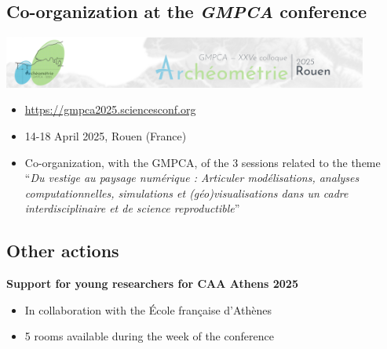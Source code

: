 \documentclass[xcolor=dvipsnames, 10pt, french, american]{beamer}
\begin{document}
\subsection{Co-organization at the \emph{GMPCA} conference}
\frame{\tableofcontents[sectionstyle=show/shaded, subsectionstyle=show/shaded/hide]}
 

\begin{frame}
    \begin{center}
        \includegraphics[width=0.9\textwidth]{figures/gmpca}
    \end{center}

    \begin{itemize}
        \item \url{https://gmpca2025.sciencesconf.org}
        \item 14-18 April 2025, Rouen (France)
        \item Co-organization, with the GMPCA, of the 3 sessions related to the theme \enquote{\emph{Du vestige au paysage numérique : Articuler modélisations, analyses computationnelles, simulations et (géo)visualisations dans un cadre interdisciplinaire et de science reproductible}}
    \end{itemize}
\end{frame}




\subsection{Other actions}
\frame{\tableofcontents[sectionstyle=show/shaded, subsectionstyle=show/shaded/hide]}
 
 
\begin{frame}
    \begin{block}{\textbf{Support for young researchers for CAA Athens 2025}}
       
        \begin{itemize}
            \item In collaboration with the École française d'Athènes
            \item 5 rooms available during the week of the conference 
        \end{itemize}
    \end{block}
\end{frame}
\end{document}

